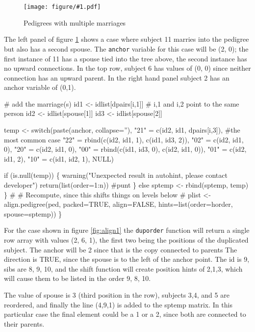 \documentclass{article}
\newcommand{\myfig}[1]{\resizebox{\textwidth}{!}
                        {\texttt{[image: figure/\#1.pdf]}}}
\begin{document}
\begin{figure}
  \myfig{autohint3}
  \caption{Pedigrees with multiple marriages}
  \label{fig:auto3}
  \end{figure}

The left panel of figure \ref{fig:auto3} shows a case where
subject 11 marries into the pedigree but also has a second spouse.
The {\tt{}anchor} variable for
this case will be (2, 0); the first instance of 11 has a spouse tied
into the tree above, the second instance has no upward connections.
In the top row, subject 6 has values of (0, 0) since neither 
connection has an upward parent.  
In the right hand panel subject 2 has an anchor variable of (0,1).

\nwenddocs{}\plusendmoddef
        # add the marriage(s)
        id1 <- idlist[dpairs[i,1]]  # i,1 and i,2 point to the same person
        id2 <- idlist[spouse[1]]
        id3 <- idlist[spouse[2]]

        temp <- switch(paste(anchor, collapse=''),
                       "21" = c(id2, id1, dpairs[i,3]),   #the most common case
                       "22" = rbind(c(id2, id1, 1), c(id1, id3, 2)),
                       "02" = c(id2, id1, 0), 
                       "20" = c(id2, id1, 0), 
                       "00" = rbind(c(id1, id3, 0), c(id2, id1, 0)),
                       "01" = c(id2, id1, 2),
                       "10" = c(id1, id2, 1),
                       NULL)

        if (is.null(temp)) \{ 
            warning("Unexpected result in autohint, please contact developer")
            return(list(order=1:n))  #punt
          \}         
        else sptemp <- rbind(sptemp, temp)
        \}
    #
    # Recompute, since this shifts things on levels below
    #
    plist <- align.pedigree(ped, packed=TRUE, align=FALSE, 
                            hints=list(order=horder, spouse=sptemp))   
    \}
\nwendcode{}\nwdocspar

For the case shown in figure \ref{fig:align1} the {\tt{}duporder} function
will return a single row array with values (2, 6, 1), the first two
being the positions of the duplicated subject.  
The anchor will be 2 since that is the copy connected to parents
The direction is TRUE, since the spouse is to the left of the anchor point.
The id is 9, sibs are 8, 9, 10, and the shift function will create position
hints of 2,1,3, which will cause them to be listed in the order 9, 8, 10.

The value of spouse is 3 (third position in the row), subjects 3,4, and 5
are reordered, and finally the line (4,9,1) is added to the sptemp 
matrix.  
In this particular case the final element could be a 1 or a 2, since both
are connected to their parents.
\end{document}
